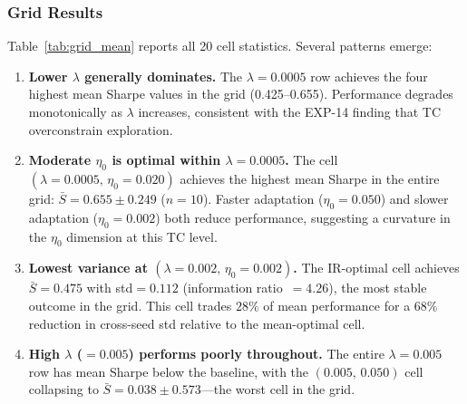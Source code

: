 \documentclass[conference]{IEEEtran}
\begin{document}
\subsubsection{Grid Results}

Table~\ref{tab:grid_mean} reports all 20 cell statistics.
Several patterns emerge:

\begin{enumerate}
    \item \textbf{Lower $\lambda$ generally dominates.}
    The $\lambda=0.0005$ row achieves the four highest mean
    Sharpe values in the grid (0.425--0.655). Performance
    degrades monotonically as $\lambda$ increases, consistent
    with the EXP-14 finding that TC overconstrain exploration.

    \item \textbf{Moderate $\eta_0$ is optimal within $\lambda=0.0005$.}
    The cell $(\lambda=0.0005,\,\eta_0=0.020)$ achieves the
    highest mean Sharpe in the entire grid:
    $\bar{S}=0.655 \pm 0.249$ ($n=10$). Faster adaptation
    ($\eta_0=0.050$) and slower adaptation ($\eta_0=0.002$)
    both reduce performance, suggesting a curvature in the
    $\eta_0$ dimension at this TC level.

    \item \textbf{Lowest variance at $(\lambda=0.002,\,\eta_0=0.002)$.}
    The IR-optimal cell achieves $\bar{S}=0.475$ with
    std$=0.112$ (information ratio~$=4.26$), the most stable
    outcome in the grid. This cell trades $28\%$ of mean
    performance for a $68\%$ reduction in cross-seed std
    relative to the mean-optimal cell.

    \item \textbf{High $\lambda$ ($=0.005$) performs poorly throughout.}
    The entire $\lambda=0.005$ row has mean Sharpe below the
    baseline, with the $(0.005,\,0.050)$ cell collapsing to
    $\bar{S}=0.038 \pm 0.573$---the worst cell in the grid.
\end{enumerate}

\begin{table}[t]
\centering
\caption{EXP-15: 4$\times$5 Grid Mean Sharpe Ratio ($n=10$ seeds,
real S\&P~500 test split 2022--2024). Bold = highest per row.
Baseline cell $(\lambda=0.001,\,\eta_0=0.010)$ marked with $^*$.}
\label{tab:grid_mean}
\end{table}
\end{document}
